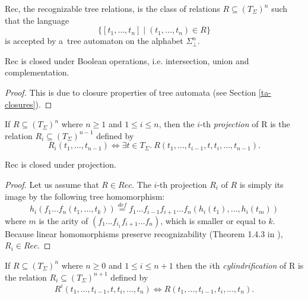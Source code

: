 \begin{defz}
Rec, the recognizable tree relations, is the class of relations $R \subseteq
(T_\Sigma)^n$ such that the language 
\begin{equation}
\{[t_1,\ldots,t_n] \mid (t_1,\ldots,t_n)
\in R\}
\end{equation} is accepted by a~tree automaton on the alphabet $\Sigma_\bot^n$.
\end{defz}

\begin{prop}
Rec is closed under Boolean operations, i.e. intersection, union and
complementation.
\end{prop}

\begin{proof}
This is due to closure properties of tree automata (see Section
\ref{ta-closures}).
\end{proof}

\begin{defz}
If $R \subseteq (T_\Sigma)^n$ where $n \geq 1$ and $1 \leq i \leq n$, then the
$i$-th \emph{projection} of R is the relation $R_i \subseteq (T_\Sigma)^{n-1}$
defined by 
\begin{equation}
 R_i(t_1,\ldots,t_{n-1}) \Leftrightarrow \exists t \in T_\Sigma
.\ R(t_1,\ldots,t_{i-1},t,t_i,\ldots,t_{n-1}).
\end{equation}
\end{defz}

\begin{lemma}
Rec is closed under projection.
\end{lemma}

\begin{proof}
 Let us assume that $R \in Rec$. The $i$-th projection $R_i$ of $R$ is simply
 its image by the following tree homomorphism:
 \begin{equation}
 h_i(f_1\ldots f_n (t_1,\ldots,t_k)) \overset{\mathit{def}}{=} f_1\ldots f_{i-1}f_{i+1}\ldots f_n(h_i(t_1),\ldots,h_i(t_m))
\end{equation}
where $m$ is the arity of $(f_1\ldots f_{i_1}f_{i+1}\ldots f_n)$, which is
smaller or equal to $k$. Because linear homomorphisms preserve recognizability
(Theorem 1.4.3 in \cite{tata}), $R_i \in Rec$.
\end{proof}

\begin{defz}
 If $R \subseteq (T_\Sigma)^n$ where $n \geq 0$ and $1 \leq i \leq n+1$ then the
 $i$th \emph{cylindrification} of R is the relation $R_i \subseteq
 (T_\Sigma)^{n+1}$ defined by 
\begin{equation}
 R^i(t_1,\ldots,t_{i-1},t,t_i,\ldots,t_n)
 \Leftrightarrow R(t_1,\ldots,t_{i-1},t_i,\ldots,t_n).
\end{equation}
\end{defz}

